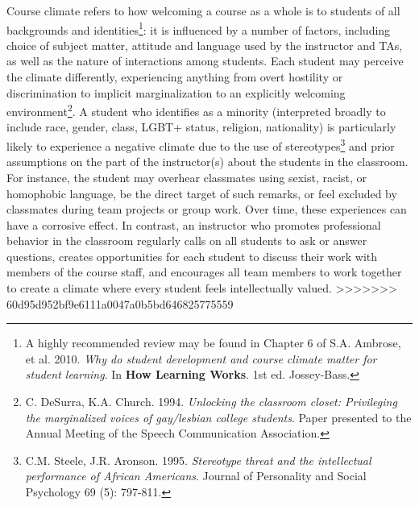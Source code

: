 Course climate refers to how welcoming a course as a whole is to students of all backgrounds and identities\footnote{A highly recommended review may be found in Chapter 6 of S.A. Ambrose, et al. 2010. \emph{Why do student development and course climate matter for student learning}. In \textbf{How Learning Works}. 1st ed. Jossey-Bass.}: it is influenced by a number of factors, including choice of subject matter, attitude and language used by the instructor and TAs, as well as the nature of interactions among students. Each student may perceive the climate differently, experiencing anything from overt hostility or discrimination to implicit marginalization to an explicitly welcoming environment\footnote{C. DeSurra, K.A. Church. 1994. \emph{Unlocking the classroom closet: Privileging the marginalized voices of gay/lesbian college students}. Paper presented to the Annual Meeting of the Speech Communication Association.}. A student who identifies as a minority (interpreted broadly to include race, gender, class, LGBT+ status, religion, nationality) is particularly likely to experience a negative climate due to the use of stereotypes\footnote{C.M. Steele, J.R. Aronson. 1995. \emph{Stereotype threat and the intellectual performance of African Americans}. Journal of Personality and Social Psychology 69 (5): 797-811.} and prior assumptions on the part of the instructor(s) about the students in the classroom. For instance, the student may overhear classmates using sexist, racist, or homophobic language, be the direct target of such remarks, or feel excluded by classmates during team projects or group work. Over time, these experiences can have a corrosive effect.   In contrast, an instructor who promotes professional behavior in the classroom regularly calls on all students to ask or answer questions, creates opportunities for each student to discuss their work with members of the course staff, and encourages all team members to work together to create a climate where every student feels intellectually valued.
>>>>>>> 60d95d952bf9e6111a0047a0b5bd646825775559

